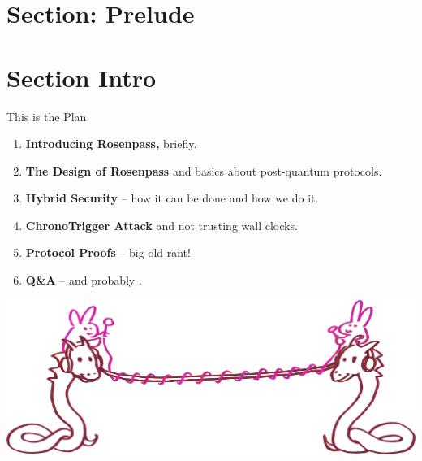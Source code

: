 \section{Section: Prelude}

\section{Section Intro}

\begin{frame}[s]{This is the Plan}
  \begin{enumerate}
    \item \textbf{Introducing Rosenpass,} briefly.
    \item \textbf{The Design of Rosenpass} and basics about post-quantum protocols.
    \item \textbf{Hybrid Security} – how it can be done and how we do it.
    \item \textbf{ChronoTrigger Attack} and not trusting wall clocks.
    \item \textbf{Protocol Proofs} – big old rant!
    \item \textbf{Q\&A} – and probably .
  \end{enumerate}

  \begin{center}
    \includegraphics[height=.3\textheight]{graphics/wireguard-and-rp-bunny-rose.png}
  \end{center}
\end{frame}



